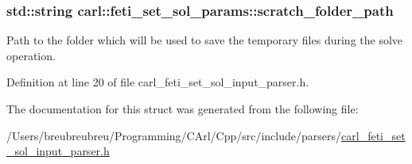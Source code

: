 \subsubsection[{scratch\+\_\+folder\+\_\+path}]{\setlength{\rightskip}{0pt plus 5cm}std\+::string carl\+::feti\+\_\+set\+\_\+sol\+\_\+params\+::scratch\+\_\+folder\+\_\+path}\label{structcarl_1_1feti__set__sol__params_ab6ddbeabd05fc4250a25c3c7f8efcdb9}


Path to the folder which will be used to save the temporary files during the solve operation. 



Definition at line 20 of file carl\+\_\+feti\+\_\+set\+\_\+sol\+\_\+input\+\_\+parser.\+h.



The documentation for this struct was generated from the following file\+:\begin{DoxyCompactItemize}
\item 
/\+Users/breubreubreu/\+Programming/\+C\+Arl/\+Cpp/src/include/parsers/\hyperlink{carl__feti__set__sol__input__parser_8h}{carl\+\_\+feti\+\_\+set\+\_\+sol\+\_\+input\+\_\+parser.\+h}\end{DoxyCompactItemize}
